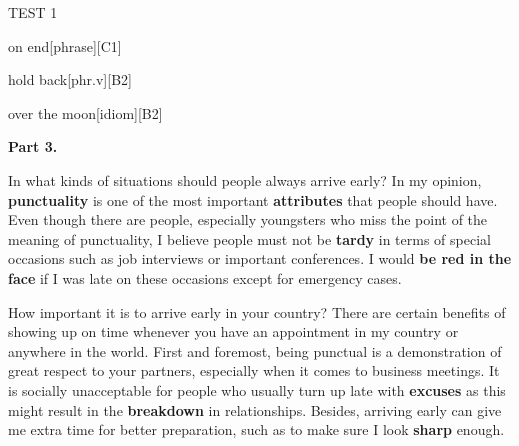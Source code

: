 \begin{glossarymc}[Cambridge 12]
\begin{test}{TEST 1}
\begin{VocabExplain}[Part 2]
            \begin{ExplainCard}{on end}[phrase][C1]
            \end{ExplainCard}

            \begin{ExplainCard}{hold back}[phr.v][B2]
            \end{ExplainCard}

            \begin{ExplainCard}{over the moon}[idiom][B2]
            \end{ExplainCard}
        \end{VocabExplain}

    \noindent
    \textbf{Part 3.}
    \begin{qa}{In what kinds of situations should people always arrive early?}
    In my opinion, \textbf{punctuality} is one of the most important \textbf{attributes} that people should have. Even though there are people, especially youngsters who miss the point of the meaning of punctuality, I believe people must not be \textbf{tardy} in terms of special occasions such as job interviews or important conferences. I would \textbf{be red in the face} if I was late on these occasions except for emergency cases.
    \end{qa}

    \begin{qa}{How important it is to arrive early in your country?}
    There are certain benefits of showing up on time whenever you have an appointment in my country or anywhere in the world. First and foremost, being punctual is a demonstration of great respect to your partners, especially when it comes to business meetings. It is socially unacceptable for people who usually turn up late with \textbf{excuses} as this might result in the \textbf{breakdown} in relationships. Besides, arriving early can give me extra time for better preparation, such as to make sure I look \textbf{sharp} enough.
    \end{qa}


\end{test}
\end{glossarymc}
